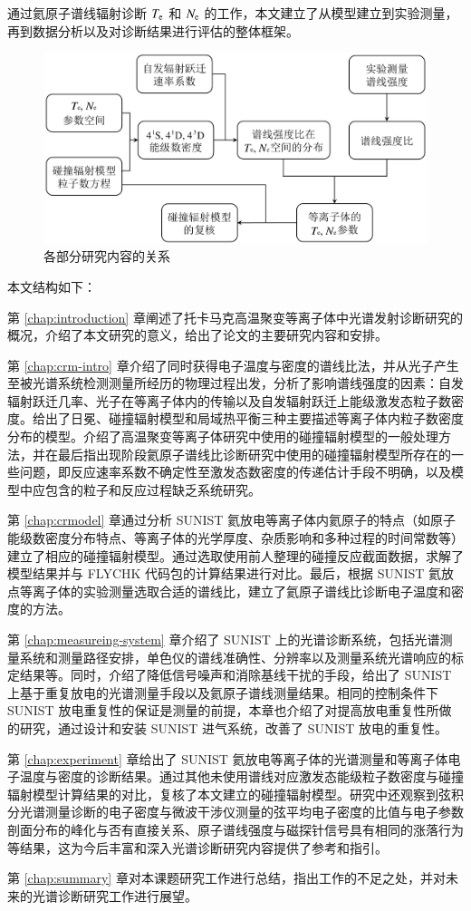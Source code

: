 通过氦原子谱线辐射诊断 $T_{\rm e}$ 和 $N_{\rm e}$ 的工作，本文建立了从模型建立到实验测量，再到数据分析以及对诊断结果进行评估的整体框架。

\begin{figure}%
  \centering
  \includegraphics[width=\textwidth]{lineratio-method-rellevelabun.pdf}
  \caption{各部分研究内容的关系}
  \label{fig:chap01:research-relationship}
\end{figure}

本文结构如下：

第 \ref{chap:introduction} 章阐述了托卡马克高温聚变等离子体中光谱发射诊断研究的概况，介绍了本文研究的意义，给出了论文的主要研究内容和安排。

第 \ref{chap:crm-intro} 章介绍了同时获得电子温度与密度的谱线比法，并从光子产生至被光谱系统检测测量所经历的物理过程出发，分析了影响谱线强度的因素：自发辐射跃迁几率、光子在等离子体内的传输以及自发辐射跃迁上能级激发态粒子数密度。给出了日冕、碰撞辐射模型和局域热平衡三种主要描述等离子体内粒子数密度分布的模型。介绍了高温聚变等离子体研究中使用的碰撞辐射模型的一般处理方法，并在最后指出现阶段氦原子谱线比诊断研究中使用的碰撞辐射模型所存在的一些问题，即反应速率系数不确定性至激发态数密度的传递估计手段不明确，以及模型中应包含的粒子和反应过程缺乏系统研究。

第 \ref{chap:crmodel} 章通过分析 SUNIST 氦放电等离子体内氦原子的特点（如原子能级数密度分布特点、等离子体的光学厚度、杂质影响和多种过程的时间常数等）建立了相应的碰撞辐射模型。通过选取使用前人整理的碰撞反应截面数据，求解了模型结果并与 FLYCHK 代码包的计算结果进行对比。最后，根据 SUNIST 氦放点等离子体的实验测量选取合适的谱线比，建立了氦原子谱线比诊断电子温度和密度的方法。

第 \ref{chap:measureing-system} 章介绍了 SUNIST 上的光谱诊断系统，包括光谱测量系统和测量路径安排，单色仪的谱线准确性、分辨率以及测量系统光谱响应的标定结果等。同时，介绍了降低信号噪声和消除基线干扰的手段，给出了 SUNIST 上基于重复放电的光谱测量手段以及氦原子谱线测量结果。相同的控制条件下 SUNIST 放电重复性的保证是测量的前提，本章也介绍了对提高放电重复性所做的研究，通过设计和安装 SUNIST 进气系统，改善了 SUNIST 放电的重复性。

第 \ref{chap:experiment} 章给出了 SUNIST 氦放电等离子体的光谱测量和等离子体电子温度与密度的诊断结果。通过其他未使用谱线对应激发态能级粒子数密度与碰撞辐射模型计算结果的对比，复核了本文建立的碰撞辐射模型。研究中还观察到弦积分光谱测量诊断的电子密度与微波干涉仪测量的弦平均电子密度的比值与电子参数剖面分布的峰化与否有直接关系、原子谱线强度与磁探针信号具有相同的涨落行为等结果，这为今后丰富和深入光谱诊断研究内容提供了参考和指引。

第 \ref{chap:summary} 章对本课题研究工作进行总结，指出工作的不足之处，并对未来的光谱诊断研究工作进行展望。

